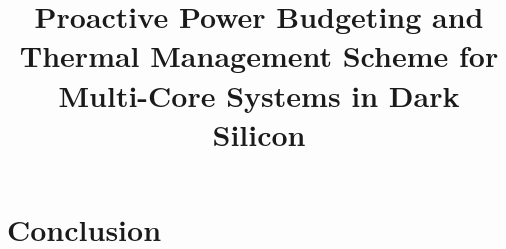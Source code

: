 \documentclass[conference]{IEEEtran}
\begin{document}
%
\title{Proactive Power Budgeting and Thermal Management Scheme
  for Multi-Core Systems in Dark Silicon}



\maketitle

\begin{abstract}

\end{abstract}

\IEEEpeerreviewmaketitle









\section{Conclusion}\label{sec:conclusion}




\end{document}
